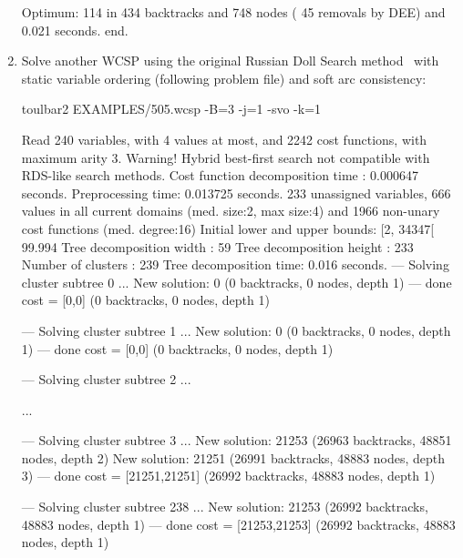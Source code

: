 \begin{enumerate}
{\begin{DoxyCode}
Optimum: 114 in 434 backtracks and 748 nodes ( 45 removals by DEE) and 0.021 seconds.
end.
\end{DoxyCode}}
\item Solve another WCSP using the original Russian Doll Search method~\cite{Verfaillie96} with static variable
ordering (following problem file) and soft arc consistency:
\begin{DoxyCode}
	toulbar2 EXAMPLES/505.wcsp -B=3 -j=1 -svo -k=1
\end{DoxyCode}
{\scriptsize
\begin{DoxyCode}
Read 240 variables, with 4 values at most, and 2242 cost functions, with maximum arity 3.
Warning! Hybrid best-first search not compatible with RDS-like search methods.
Cost function decomposition time : 0.000647 seconds.
Preprocessing time: 0.013725 seconds.
233 unassigned variables, 666 values in all current domains (med. size:2, max size:4) and 1966 non-unary cost functions (med. degree:16)
Initial lower and upper bounds: [2, 34347[ 99.994%
Tree decomposition width  : 59
Tree decomposition height : 233
Number of clusters        : 239
Tree decomposition time: 0.016 seconds.
--- Solving cluster subtree 0 ...
New solution: 0 (0 backtracks, 0 nodes, depth 1)
---  done  cost = [0,0] (0 backtracks, 0 nodes, depth 1)

--- Solving cluster subtree 1 ...
New solution: 0 (0 backtracks, 0 nodes, depth 1)
---  done  cost = [0,0] (0 backtracks, 0 nodes, depth 1)

--- Solving cluster subtree 2 ...

...

--- Solving cluster subtree 3 ...
New solution: 21253 (26963 backtracks, 48851 nodes, depth 2)
New solution: 21251 (26991 backtracks, 48883 nodes, depth 3)
---  done  cost = [21251,21251] (26992 backtracks, 48883 nodes, depth 1)

--- Solving cluster subtree 238 ...
New solution: 21253 (26992 backtracks, 48883 nodes, depth 1)
---  done  cost = [21253,21253] (26992 backtracks, 48883 nodes, depth 1)


\end{DoxyCode}}
\end{enumerate}
